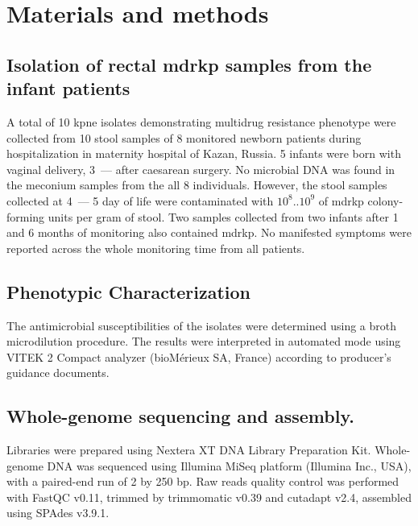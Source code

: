 \documentclass[12pt,a4paper]{article}
\begin{document}
\section{Materials and methods}\label{sec:mat_met}
\subsection{Isolation of rectal \gls{mdrkp} samples from the infant patients}\label{subsec:iso}
A total of 10 \gls{kpne} isolates demonstrating multidrug resistance phenotype were collected from 10
stool samples of 8 monitored newborn patients during hospitalization in maternity hospital of Kazan, Russia.
5 infants were born with vaginal delivery, 3~--- after caesarean surgery.
No microbial DNA was found in the meconium samples from the all 8 individuals.
However, the stool samples collected at 4~--- 5 day of life were contaminated with $10^8$..$10^9$ of \gls{mdrkp}
colony-forming units per gram of stool.
Two samples collected from two infants after 1 and 6 months of monitoring also contained \gls{mdrkp}.
No manifested symptoms were reported across the whole monitoring time from all patients.

\subsection{Phenotypic Characterization}\label{subsec:phe}
The antimicrobial susceptibilities of the isolates were determined using a broth microdilution procedure.
The results were interpreted in automated mode using VITEK 2 Compact analyzer (bioMérieux SA, France) according to
producer's guidance documents.

\subsection{Whole-genome sequencing and assembly.}\label{subsec:proc_raw}
Libraries were prepared using Nextera XT DNA Library Preparation Kit.
Whole-genome DNA was sequenced using Illumina MiSeq platform (Illumina Inc., USA),
with a paired-end run of 2 by 250 bp.
Raw reads quality control was performed with FastQC v0.11,  %
trimmed by trimmomatic v0.39  %
and cutadapt v2.4,  %
assembled using SPAdes v3.9.1.  %
\end{document}
